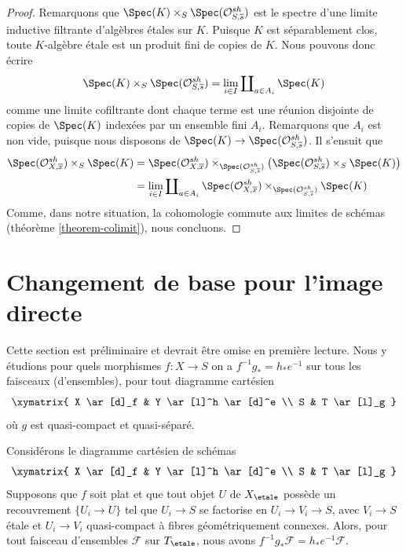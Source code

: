 \begin{proof}
Remarquons que $\Spec(K) \times_S \Spec(\mathcal{O}^{sh}_{S, \overline{s}})$
est le spectre d'une limite inductive filtrante d'algèbres étales sur $K$.
Puisque $K$ est séparablement clos, toute $K$-algèbre étale
est un produit fini de copies de $K$. Nous pouvons donc écrire
$$
\Spec(K) \times_S \Spec(\mathcal{O}^{sh}_{S, \overline{s}}) =
\lim_{i \in I} \coprod\nolimits_{a \in A_i} \Spec(K)
$$
comme une limite cofiltrante dont chaque terme est une réunion disjointe
de copies de $\Spec(K)$ indexées par un ensemble fini $A_i$.
Remarquons que $A_i$ est non vide, puisque nous disposons de
$\Spec(K) \to \Spec(\mathcal{O}^{sh}_{S, \overline{s}})$.
Il s'ensuit que
\begin{align*}
\Spec(\mathcal{O}^{sh}_{X, \overline{x}}) \times_S \Spec(K)
& =
\Spec(\mathcal{O}^{sh}_{X, \overline{x}})
\times_{\Spec(\mathcal{O}^{sh}_{S, \overline{s}})}
\left(
\Spec(\mathcal{O}^{sh}_{S, \overline{s}})
\times_S \Spec(K)\right) \\
& =
\lim_{i \in I} \coprod\nolimits_{a \in A_i}
\Spec(\mathcal{O}^{sh}_{X, \overline{x}})
\times_{\Spec(\mathcal{O}^{sh}_{S, \overline{s}})} \Spec(K)
\end{align*}
Comme, dans notre situation, la cohomologie commute aux limites
de schémas (théorème \ref{theorem-colimit}), nous concluons.
\end{proof}













\section{Changement de base pour l'image directe}
\label{section-base-change-f-star}

\noindent
Cette section est préliminaire et devrait être omise en première lecture.
Nous y étudions pour quels morphismes $f : X \to S$ on a
$f^{-1}g_* = h_*e^{-1}$ sur tous les faisceaux (d'ensembles), pour tout
diagramme cartésien
$$
\xymatrix{
X \ar[d]_f & Y \ar[l]^h \ar[d]^e \\
S & T \ar[l]_g
}
$$
où $g$ est quasi-compact et quasi-séparé.

\begin{lemma}
\label{lemma-base-change-f-star-general}
Considérons le diagramme cartésien de schémas
$$
\xymatrix{
X \ar[d]_f & Y \ar[l]^h \ar[d]^e \\
S & T \ar[l]_g
}
$$
Supposons que $f$ soit plat et que tout objet $U$ de $X_\etale$ possède
un recouvrement $\{U_i \to U\}$ tel que $U_i \to S$
se factorise en $U_i \to V_i \to S$, avec $V_i \to S$
étale et $U_i \to V_i$ quasi-compact à
fibres géométriquement connexes.
Alors, pour tout faisceau d'ensembles $\mathcal{F}$ sur $T_\etale$, nous avons
$f^{-1}g_*\mathcal{F} = h_*e^{-1}\mathcal{F}$.
\end{lemma}

